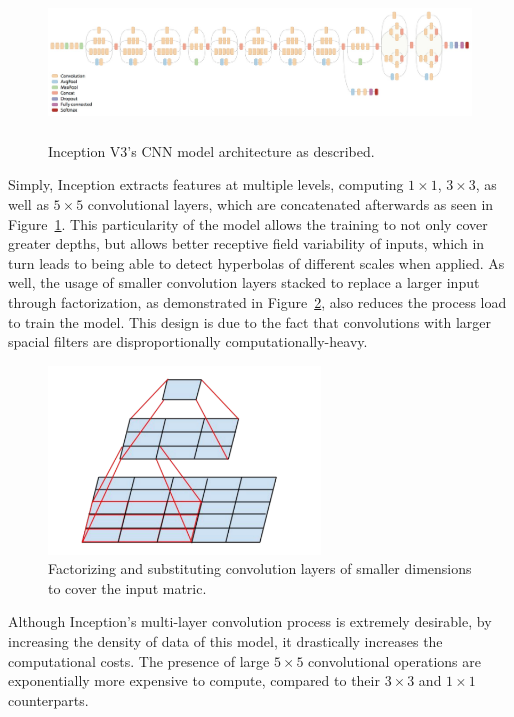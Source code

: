 \documentclass[se,blockletter]{uw-wkrpt}
\begin{document}
\begin{figure}
  \centering
  \includegraphics[height=40mm]{inception-architecture}
  \caption{Inception V3's CNN model architecture as described.~\cite{ref:}}
  \label{fig:inception-architecture}
\end{figure}

Simply, Inception extracts features at multiple levels, computing $1\times 1$, $3\times 3$, as well as $5 \times 5$ convolutional layers, which are concatenated afterwards as seen in Figure~\ref{fig:inception-architecture}. This particularity of the model allows the training to not only cover greater depths, but allows better receptive field variability of inputs, which in turn leads to being able to detect hyperbolas of different scales when applied. As well, the usage of smaller convolution layers stacked to replace a larger input through factorization, as demonstrated in Figure~\ref{fig:convolution-substitution}, also reduces the process load to train the model. This design is due to the fact that convolutions with larger spacial filters are disproportionally computationally-heavy. 

\begin{figure}
  \centering
  \includegraphics[height=5cm]{convolution-substitution}
  \caption{Factorizing and substituting convolution layers of smaller dimensions to cover the input matric.~\cite{ref:}}
  \label{fig:convolution-substitution}
\end{figure}

Although Inception's multi-layer convolution process is extremely desirable, by increasing the density of data of this model, it drastically increases the computational costs. The presence of large $5\times 5$ convolutional operations are exponentially more expensive to compute, compared to their $3\times 3$ and $1\times 1$ counterparts.
\end{document}
